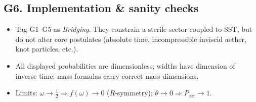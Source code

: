 \documentclass[11pt]{article}
\begin{document}
      \subsection*{G6. Implementation \& sanity checks}
          \begin{itemize}
          \item Tag G1--G5 as \emph{Bridging}. They constrain a sterile sector coupled to SST, but do not alter core postulates (absolute time, incompressible inviscid aether, knot particles, etc.).
          \item All displayed probabilities are dimensionless; widths have dimension of inverse time; mass formulas carry correct mass dimensions.
          \item Limits: $\omega\!\to\!\tfrac12 \Rightarrow f(\omega)\!\to\!0$ ($R$-symmetry); $\theta\!\to\!0 \Rightarrow P_{\alpha\alpha}\!\to\!1$.
          \end{itemize}
\end{document}
